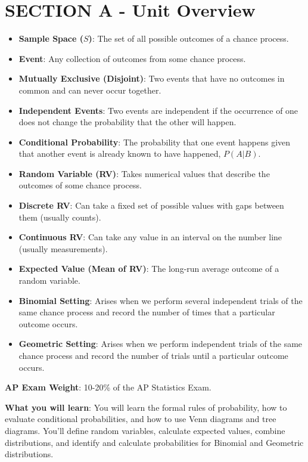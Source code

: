 \section{SECTION A - Unit Overview}
\begin{lessonbox}
\begin{itemize}
    \item \textbf{Sample Space ($S$)}: The set of all possible outcomes of a chance process.
    \item \textbf{Event}: Any collection of outcomes from some chance process.
    \item \textbf{Mutually Exclusive (Disjoint)}: Two events that have no outcomes in common and can never occur together.
    \item \textbf{Independent Events}: Two events are independent if the occurrence of one does not change the probability that the other will happen.
    \item \textbf{Conditional Probability}: The probability that one event happens given that another event is already known to have happened, $P(A | B)$.
    \item \textbf{Random Variable (RV)}: Takes numerical values that describe the outcomes of some chance process.
    \item \textbf{Discrete RV}: Can take a fixed set of possible values with gaps between them (usually counts).
    \item \textbf{Continuous RV}: Can take any value in an interval on the number line (usually measurements).
    \item \textbf{Expected Value (Mean of RV)}: The long-run average outcome of a random variable.
    \item \textbf{Binomial Setting}: Arises when we perform several independent trials of the same chance process and record the number of times that a particular outcome occurs.
    \item \textbf{Geometric Setting}: Arises when we perform independent trials of the same chance process and record the number of trials until a particular outcome occurs.
\end{itemize}
\end{lessonbox}

\textbf{AP Exam Weight}: 10-20\% of the AP Statistics Exam.

\textbf{What you will learn}: You will learn the formal rules of probability, how to evaluate conditional probabilities, and how to use Venn diagrams and tree diagrams. You'll define random variables, calculate expected values, combine distributions, and identify and calculate probabilities for Binomial and Geometric distributions.

